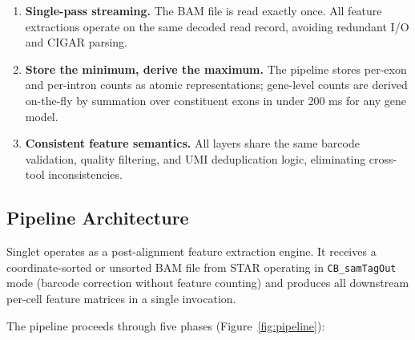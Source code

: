\documentclass[11pt,a4paper]{article}
\begin{document}
\begin{enumerate}
    \item \textbf{Single-pass streaming.} The BAM file is read exactly once. All feature extractions operate on the same decoded read record, avoiding redundant I/O and CIGAR parsing.
    \item \textbf{Store the minimum, derive the maximum.} The pipeline stores per-exon and per-intron counts as atomic representations; gene-level counts are derived on-the-fly by summation over constituent exons in under 200 ms for any gene model.
    \item \textbf{Consistent feature semantics.} All layers share the same barcode validation, quality filtering, and UMI deduplication logic, eliminating cross-tool inconsistencies.
\end{enumerate}

\subsection{Pipeline Architecture}

Singlet operates as a post-alignment feature extraction engine. It receives a coordinate-sorted or unsorted BAM file from STAR \citep{dobin2013star} operating in \texttt{CB\_samTagOut} mode (barcode correction without feature counting) and produces all downstream per-cell feature matrices in a single invocation.

The pipeline proceeds through five phases (Figure~\ref{fig:pipeline}):
\end{document}
